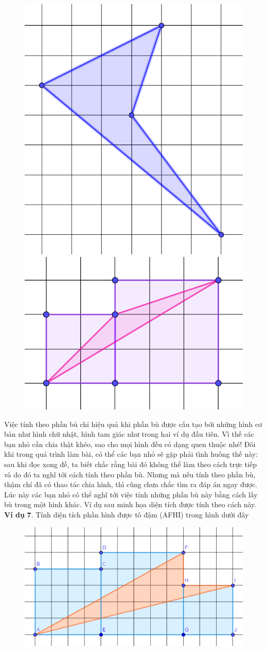 \begin{multicols}{2}
\begin{figure}[H]
		\includegraphics[width=0.55\linewidth]{15}
		\includegraphics[width=0.48\linewidth]{16}
		\vspace*{-10pt}
	\end{figure}
	Việc tính theo phần bù chỉ hiệu quả khi phần bù được cấu tạo bởi những hình cơ bản như hình chữ nhật, hình tam giác như trong hai ví dụ đầu tiên. Vì thế các bạn nhỏ cần chia thật khéo, sao cho mọi hình đều có dạng quen thuộc nhé!  
	\vskip 0.1cm
	Đôi khi trong quá trình làm bài, có thể các bạn nhỏ sẽ gặp phải tình huống thế này: sau khi đọc xong đề, ta biết chắc rằng bài đó không thể làm theo cách trực tiếp và do đó ta nghĩ tới cách tính theo phần bù. Nhưng mà nếu tính theo phần bù, thậm chí đã có thao tác chia hình, thì cũng chưa chắc tìm ra đáp án ngay được. Lúc này các bạn nhỏ có thể nghĩ tới việc tính những phần bù này bằng cách lấy bù trong một hình khác. Ví dụ sau minh họa diện tích được tính theo cách này.  
	\vskip 0.1cm
	\textbf{\color{toancuabi}Ví dụ} $\pmb{7.}$ Tính diện tích phần hình được tô đậm (AFHI) trong hình dưới đây
	\begin{figure}[H]
		\centering
		\captionsetup{labelformat= empty, justification=centering}
		\includegraphics[width=1\linewidth]{17}

\end{figure}
\end{multicols}
